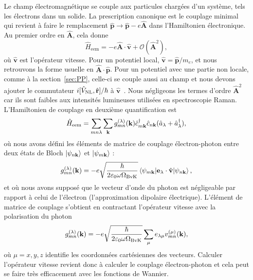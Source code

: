 Le champ électromagnétique se couple aux particules chargées d'un système, tels les électrons dans un solide. La prescription canonique est le couplage minimal qui revient à faire le remplacement $\hat{\mathbf{p}}\rightarrow \hat{\mathbf{p}}-e\hat{\mathbf{A}}$ dans l'Hamiltonien électronique. Au premier ordre en $\hat{\mathbf{A}}$, cela donne
\begin{equation}
    \hat{H}_\text{eem}=-e\hat{\mathbf{A}}\cdot\hat{\mathbf{v}}+\mathcal{O}(\hat{\mathbf{A}}^2),
\end{equation}
où $\hat{\mathbf{v}}$ est l'opérateur vitesse. Pour un potentiel local, $\hat{\mathbf{v}}=\hat{\mathbf{p}}/m_e$, et nous retrouvons la forme usuelle en $\hat{\mathbf{A}}\cdot\hat{\mathbf{p}}$. Pour un potentiel avec une partie non locale, comme à la section~\ref{sec:PP}, celle-ci se couple aussi au champ et nous devons ajouter le commutateur $i[\hat{V}_\text{NL},\hat{\mathbf{r}}]/\hbar$ à $\hat{\mathbf{v}}$~\cite{ismail-beigiCouplingNonlocalPotentials2001}. Nous négligeons les termes d'ordre $\hat{\mathbf{A}}^2$ car ils sont faibles aux intensités lumineuses utilisées en spectroscopie Raman. L'Hamiltonien de couplage en deuxième quantification est
\begin{equation}
    \hat{H}_\text{eem}=\sum_{mn\lambda}\sum_{\mathbf{k}} g_{mn}^{(\lambda)}(\mathbf{k})\hat{c}^\dag_{m\mathbf{k}}\hat{c}_{n\mathbf{k}}(\hat{a}_\lambda+\hat{a}^\dag_\lambda),\label{eqn:H_eem}
\end{equation}
où nous avons défini les éléments de matrice de couplage électron-photon entre deux états de Bloch $\ket{\psi_{n\mathbf{k}}}$ et $\ket{\psi_{m\mathbf{k}}}$ :
\begin{equation}
    g^{(\lambda)}_{mn}(\kv) = -e\sqrt{\frac{\hbar}{2\varepsilon_0 \omega \Omega_\text{BvK}}}\matrixel{\psi_{m\kv}}{\mathbf{e}_\lambda\cdot\hat{\mathbf{v}}}{\psi_{n\kv}},
\end{equation}
et où nous avons supposé que le vecteur d'onde du photon est négligeable par rapport à celui de l'électron (l'approximation dipolaire électrique). L'élément de matrice de couplage s'obtient en contractant l'opérateur vitesse avec la polarisation du photon
\begin{equation}
    g^{(\lambda)}_{mn}(\mathbf{k}) = -e\sqrt{\frac{\hbar}{2\varepsilon_0\omega \Omega_\text{BvK}}}\sum_\mu e_{\lambda\mu}v_{mn}^{(\mu)}(\mathbf{k}),\label{eqn:eem}
\end{equation}
où $\mu=x,y,z$ identifie les coordonnées cartésiennes des vecteurs. Calculer l'opérateur vitesse revient donc à calculer le couplage électron-photon et cela peut se faire très efficacement avec les fonctions de Wannier.

